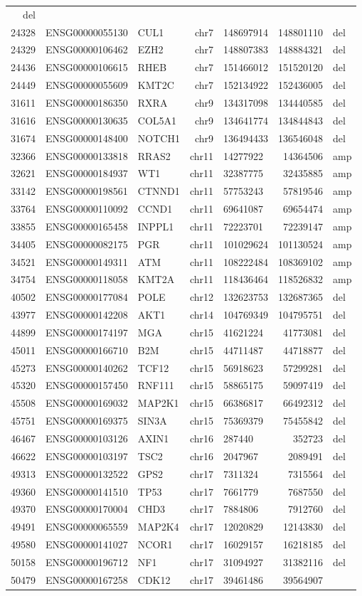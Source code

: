 \documentclass[]{article}
\begin{document}
\begin{longtable}[]{@{}rrlrlrl@{}}
del\tabularnewline
24328 & ENSG00000055130 & CUL1 & chr7 & 148697914 & 148801110 &
del\tabularnewline
24329 & ENSG00000106462 & EZH2 & chr7 & 148807383 & 148884321 &
del\tabularnewline
24436 & ENSG00000106615 & RHEB & chr7 & 151466012 & 151520120 &
del\tabularnewline
24449 & ENSG00000055609 & KMT2C & chr7 & 152134922 & 152436005 &
del\tabularnewline
31611 & ENSG00000186350 & RXRA & chr9 & 134317098 & 134440585 &
del\tabularnewline
31616 & ENSG00000130635 & COL5A1 & chr9 & 134641774 & 134844843 &
del\tabularnewline
31674 & ENSG00000148400 & NOTCH1 & chr9 & 136494433 & 136546048 &
del\tabularnewline
32366 & ENSG00000133818 & RRAS2 & chr11 & 14277922 & 14364506 &
amp\tabularnewline
32621 & ENSG00000184937 & WT1 & chr11 & 32387775 & 32435885 &
amp\tabularnewline
33142 & ENSG00000198561 & CTNND1 & chr11 & 57753243 & 57819546 &
amp\tabularnewline
33764 & ENSG00000110092 & CCND1 & chr11 & 69641087 & 69654474 &
amp\tabularnewline
33855 & ENSG00000165458 & INPPL1 & chr11 & 72223701 & 72239147 &
amp\tabularnewline
34405 & ENSG00000082175 & PGR & chr11 & 101029624 & 101130524 &
amp\tabularnewline
34521 & ENSG00000149311 & ATM & chr11 & 108222484 & 108369102 &
amp\tabularnewline
34754 & ENSG00000118058 & KMT2A & chr11 & 118436464 & 118526832 &
amp\tabularnewline
40502 & ENSG00000177084 & POLE & chr12 & 132623753 & 132687365 &
del\tabularnewline
43977 & ENSG00000142208 & AKT1 & chr14 & 104769349 & 104795751 &
del\tabularnewline
44899 & ENSG00000174197 & MGA & chr15 & 41621224 & 41773081 &
del\tabularnewline
45011 & ENSG00000166710 & B2M & chr15 & 44711487 & 44718877 &
del\tabularnewline
45273 & ENSG00000140262 & TCF12 & chr15 & 56918623 & 57299281 &
del\tabularnewline
45320 & ENSG00000157450 & RNF111 & chr15 & 58865175 & 59097419 &
del\tabularnewline
45508 & ENSG00000169032 & MAP2K1 & chr15 & 66386817 & 66492312 &
del\tabularnewline
45751 & ENSG00000169375 & SIN3A & chr15 & 75369379 & 75455842 &
del\tabularnewline
46467 & ENSG00000103126 & AXIN1 & chr16 & 287440 & 352723 &
del\tabularnewline
46622 & ENSG00000103197 & TSC2 & chr16 & 2047967 & 2089491 &
del\tabularnewline
49313 & ENSG00000132522 & GPS2 & chr17 & 7311324 & 7315564 &
del\tabularnewline
49360 & ENSG00000141510 & TP53 & chr17 & 7661779 & 7687550 &
del\tabularnewline
49370 & ENSG00000170004 & CHD3 & chr17 & 7884806 & 7912760 &
del\tabularnewline
49491 & ENSG00000065559 & MAP2K4 & chr17 & 12020829 & 12143830 &
del\tabularnewline
49580 & ENSG00000141027 & NCOR1 & chr17 & 16029157 & 16218185 &
del\tabularnewline
50158 & ENSG00000196712 & NF1 & chr17 & 31094927 & 31382116 &
del\tabularnewline
50479 & ENSG00000167258 & CDK12 & chr17 & 39461486 & 39564907 &

\end{longtable}
\end{document}
